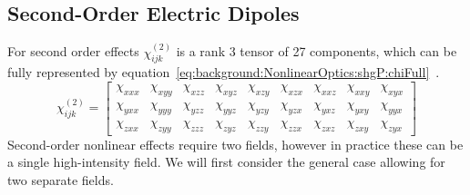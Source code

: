 \subsection{Second-Order Electric Dipoles}\label{sec:background:NonlinearOptics:shgP}
For second order effects $\chi^{(2)}_{ijk}$ is a rank 3 tensor of 27 components, which can be fully represented by equation~\ref{eq:background:NonlinearOptics:shgP:chiFull}~\cite{verbiest2009second}.
\begin{equation}\label{eq:background:NonlinearOptics:shgP:chiFull}
	\chi^{(2)}_{ijk} =
	\begin{bmatrix}
		\chi_{xxx} & \chi_{xyy} & \chi_{xzz} & \chi_{xyz} & \chi_{xzy} & \chi_{xzx} & \chi_{xxz} & \chi_{xxy} & \chi_{xyx}\\ 
		\chi_{yxx} & \chi_{yyy} & \chi_{yzz} & \chi_{yyz} & \chi_{yzy} & \chi_{yzx} & \chi_{yxz} & \chi_{yxy} & \chi_{yyx}\\ 
		\chi_{zxx} & \chi_{zyy} & \chi_{zzz} & \chi_{zyz} & \chi_{zzy} & \chi_{zzx} & \chi_{zxz} & \chi_{zxy} & \chi_{zyx}
	\end{bmatrix}
\end{equation}
Second-order nonlinear effects require two fields, however in practice these can be a single high-intensity field. We will first consider the general case allowing for two separate fields.

